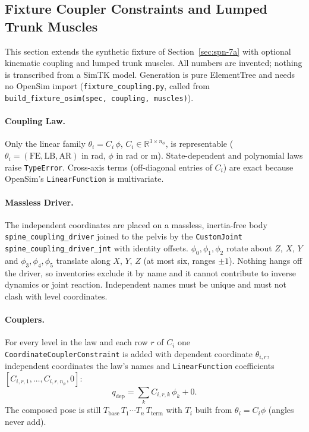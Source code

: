 \subsection{Fixture Coupler Constraints and Lumped Trunk Muscles}
\label{sec:spn-7b}

This section extends the synthetic fixture of Section~\ref{sec:spn-7a} with
optional kinematic coupling and lumped trunk muscles. All numbers are invented;
nothing is transcribed from a SimTK model. Generation is pure ElementTree and
needs no OpenSim import
(\texttt{fixture\_coupling.py}, called from \texttt{build\_fixture\_osim(spec, coupling, muscles)}).

\paragraph{Coupling Law.} Only the linear family
$\theta_i = C_i\,\phi$, $C_i\in\mathbb{R}^{3\times n_\phi}$, is representable
($\theta_i=(\mathrm{FE},\mathrm{LB},\mathrm{AR})$ in rad, $\phi$ in rad or m).
State-dependent and polynomial laws raise \texttt{TypeError}. Cross-axis terms
(off-diagonal entries of $C_i$) are exact because OpenSim's
\texttt{LinearFunction} is multivariate.

\paragraph{Massless Driver.} The independent coordinates are placed on a
massless, inertia-free body \texttt{spine\_coupling\_driver} joined to the pelvis
by the \texttt{CustomJoint} \texttt{spine\_coupling\_driver\_jnt} with identity
offsets. $\phi_0,\phi_1,\phi_2$ rotate about $Z$, $X$, $Y$ and
$\phi_3,\phi_4,\phi_5$ translate along $X$, $Y$, $Z$ (at most six, ranges
$\pm1$). Nothing hangs off the driver, so inventories exclude it by name and it
cannot contribute to inverse dynamics or joint reaction. Independent names must
be unique and must not clash with level coordinates.

\paragraph{Couplers.} For every level in the law and each row $r$ of $C_i$ one
\texttt{CoordinateCouplerConstraint} is added with dependent coordinate
$\theta_{i,r}$, independent coordinates the law's names and
\texttt{LinearFunction} coefficients $[C_{i,r,1},\dots,C_{i,r,n_\phi},0]$:
\begin{equation}
  q_{\mathrm{dep}} = \sum_k C_{i,r,k}\,\phi_k + 0 .
\end{equation}
The composed pose is still
$T_{\mathrm{base}}\,T_1\cdots T_n\,T_{\mathrm{term}}$ with $T_i$ built from
$\theta_i=C_i\phi$ (angles never add).

